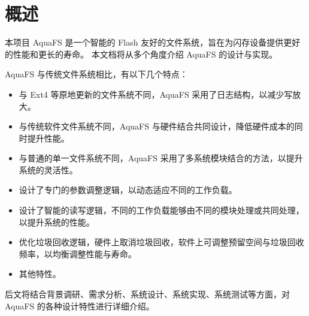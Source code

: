 \section{概述}

本项目 AquaFS 是一个智能的 Flash 友好的文件系统，旨在为闪存设备提供更好的性能和更长的寿命。
本文档将从多个角度介绍 AquaFS 的设计与实现。

AquaFS 与传统文件系统相比，有以下几个特点：

\begin{itemize}
    \item 与 Ext4 等原地更新的文件系统不同，AquaFS 采用了日志结构，以减少写放大。
    \item 与传统软件文件系统不同，AquaFS 与硬件结合共同设计，降低硬件成本的同时提升性能。
    \item 与普通的单一文件系统不同，AquaFS 采用了多系统模块结合的方法，以提升系统的灵活性。
    \item 设计了专门的参数调整逻辑，以动态适应不同的工作负载。
    \item 设计了智能的读写逻辑，不同的工作负载能够由不同的模块处理或共同处理，以提升系统的性能。
    \item 优化垃圾回收逻辑，硬件上取消垃圾回收，软件上可调整预留空间与垃圾回收频率，以均衡调整性能与寿命。
    \item 其他特性。
\end{itemize}

后文将结合背景调研、需求分析、系统设计、系统实现、系统测试等方面，对 AquaFS 的各种设计特性进行详细介绍。
